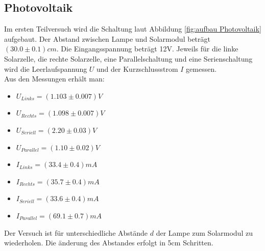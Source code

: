 \documentclass[12pt,a4paper,twoside]{article}
\begin{document}
\subsection{Photovoltaik}
Im ersten Teilversuch wird die Schaltung laut Abbildung \ref{fig:aufbau Photovoltaik} aufgebaut. Der Abstand zwischen Lampe und Solarmodul beträgt $(30.0 \pm 0.1)cm $. 
Die Eingangsspannung beträgt 12V. 
Jeweils für die linke Solarzelle, die rechte Solarzelle, eine Parallelschaltung und eine Serienschaltung wird die Leerlaufspannung $U$ und der Kurzschlussstrom $I$ gemessen. 
\\
Aus den Messungen erhält man: 
\begin{itemize}
    \item $U_{Links} = (1.103 \pm 0.007)V$
    \item $U_{Rechts} = (1.098 \pm 0.007)V$
    \item $U_{Seriell} = (2.20 \pm 0.03)V$
    \item $U_{Parallel} = (1.10 \pm 0.02)V$
    
    \item $I_{Links} = (33.4 \pm 0.4)mA$
    \item $I_{Rechts} = (35.7 \pm 0.4)mA$
    \item $I_{Seriell} = (33.6 \pm 0.4)mA$
    \item $I_{Parallel} = (69.1 \pm 0.7)mA$
\end{itemize}

\noindent
Der Versuch ist für unterschiedliche Abstände $d$ der Lampe zum Solarmodul zu wiederholen. Die änderung des Abstandes erfolgt in 5cm Schritten. 
\end{document}
